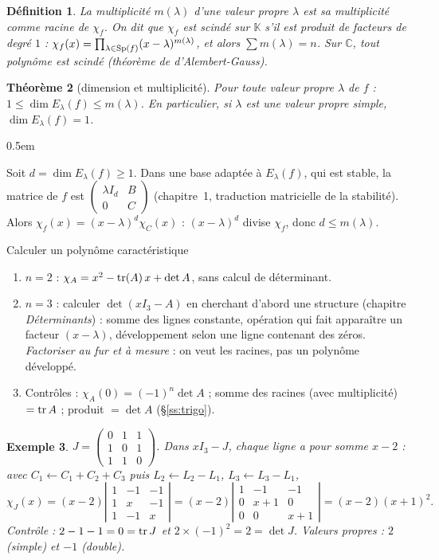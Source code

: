 \documentclass[a4paper,11pt]{article}
\makeatletter
\numberwithin{equation}{section}
\numberwithin{figure}{section}
\numberwithin{table}{section}
\theoremstyle{enonce}
\newtheorem{definition}{Définition}[section]
\newtheorem{theoreme}[definition]{Théorème}
\theoremstyle{exemple}
\newtheorem{exemple}[definition]{Exemple}
\theoremstyle{remarque}
\renewcommand{\proofname}{Démonstration}
\renewenvironment{proof}[1][\proofname]{\par\pushQED{\qed}\normalfont
  \topsep0.5em\relax\trivlist\item[\hskip\labelsep\sffamily\itshape\color{Gris}#1.]\ignorespaces}
  {\popQED\endtrivlist\@endpefalse}
\newcommand{\K}{\mathbb{K}}
\newcommand{\C}{\mathbb{C}}
\newcommand{\dt}[1]{\left|\begin{matrix}#1\end{matrix}\right|}
\makeatother
\begin{document}
\begin{definition}
La \emph{multiplicité} $m(\lambda)$ d'une valeur propre $\lambda$ est sa multiplicité comme racine de $\chi_f$. On dit que $\chi_f$
est \emph{scindé} sur $\K$ s'il est produit de facteurs de degré $1$ : $\chi_f(x)=\prod_{\lambda\in\operatorname{Sp}(f)}(x-\lambda)^{m(\lambda)}$,
et alors $\sum m(\lambda)=n$. Sur $\C$, tout polynôme est scindé (théorème de d'Alembert-Gauss).
\end{definition}

\begin{theoreme}[dimension et multiplicité]\label{t:dim-mult}
Pour toute valeur propre $\lambda$ de $f$ : \quad $1\leq\dim E_\lambda(f)\leq m(\lambda)$.
En particulier, si $\lambda$ est une valeur propre simple, $\dim E_\lambda(f)=1$.
\end{theoreme}

\begin{proof}
Soit $d=\dim E_\lambda(f)\geq1$. Dans une base adaptée à $E_\lambda(f)$, qui est stable, la matrice de $f$ est
$\begin{pmatrix}\lambda I_d&B\\0&C\end{pmatrix}$ (chapitre~1, traduction matricielle de la stabilité). Alors $\chi_f(x)=(x-\lambda)^d\chi_C(x)$ : $(x-\lambda)^d$
divise $\chi_f$, donc $d\leq m(\lambda)$.
\end{proof}

\begin{methode}{Calculer un polynôme caractéristique}\label{m:polcar}
\begin{enumerate}
\item $n=2$ : $\chi_A=x^2-\operatorname{tr}(A)\,x+\det A$, sans calcul de déterminant.
\item $n=3$ : calculer $\det(xI_3-A)$ en cherchant d'abord une structure (chapitre \emph{Déterminants}) : somme des lignes
constante, opération qui fait apparaître un facteur $(x-\lambda)$, développement selon une ligne contenant des zéros.
\emph{Factoriser au fur et à mesure} : on veut les racines, pas un polynôme développé.
\item Contrôles : $\chi_A(0)=(-1)^n\det A$ ; somme des racines (avec multiplicité) $=\operatorname{tr} A$ ; produit $=\det A$ (§\ref{ss:trigo}).
\end{enumerate}
\end{methode}

\begin{exemple}
$J=\begin{pmatrix}0&1&1\\1&0&1\\1&1&0\end{pmatrix}$. Dans $xI_3-J$, chaque ligne a pour somme $x-2$ : avec $C_1\leftarrow C_1+C_2+C_3$
puis $L_2\leftarrow L_2-L_1$, $L_3\leftarrow L_3-L_1$,
\[\chi_J(x)=(x-2)\dt{1&-1&-1\\1&x&-1\\1&-1&x}=(x-2)\dt{1&-1&-1\\0&x+1&0\\0&0&x+1}=(x-2)(x+1)^2.\]
Contrôle : $2-1-1=0=\operatorname{tr} J$ et $2\times(-1)^2=2=\det J$. Valeurs propres : $2$ (simple) et $-1$ (double).
\end{exemple}
\end{document}
